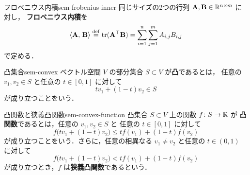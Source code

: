 \begin{definition}{フロベニウス内積}{sem-frobenius-inner}
  同じサイズの2つの行列 $\mathbf{A}, \mathbf{B} \in \mathbb{R}^{n \times m}$ に対し，
  \textbf{フロベニウス内積}を
  \[
    \langle \mathbf{A},\, \mathbf{B} \rangle
    \overset{\mathrm{def}}{=} \operatorname{tr}(\mathbf{A}^\top \mathbf{B})
    = \sum_{i=1}^{n} \sum_{j=1}^{m} A_{i,j} B_{i,j}
  \]
  で定める．
\end{definition}

\begin{definition}{凸集合}{sem-convex}
  ベクトル空間 $V$ の部分集合 $S \subset V$ が\textbf{凸}であるとは，
  任意の $v_1, v_2 \in S$ と任意の $t \in [0,1]$ に対して
  \[
    t v_1 + (1-t) v_2 \in S
  \]
  が成り立つことをいう．
\end{definition}

\begin{definition}{凸関数と狭義凸関数}{sem-convex-function}
  凸集合 $S \subset V$ 上の関数 $f \colon S \to \mathbb{R}$ が
  \textbf{凸関数}であるとは，任意の $v_1, v_2 \in S$ と
  任意の $t \in [0,1]$ に対して
  \[
    f\bigl(t v_1 + (1-t)v_2\bigr)
    \leq
    t f(v_1) + (1-t) f(v_2)
  \]
  が成り立つことをいう．さらに，任意の相異なる
  $v_1 \neq v_2$ と任意の $t \in (0,1)$ に対して
  \[
    f\bigl(t v_1 + (1-t)v_2\bigr)
    <
    t f(v_1) + (1-t) f(v_2)
  \]
  が成り立つとき，$f$ は\textbf{狭義凸関数}であるという．
\end{definition}
